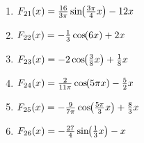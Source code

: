 \begin{Answer}[ref=trigStammfunktionA1]
\begin{minipage}{\textwidth}
{\begin{minipage}{0.5\linewidth}
\begin{enumerate}[label=\alph*)]
					\item \(F_{21}(x)=\frac{16}{3\pi}\sinn{\frac{3\pi}{4}x}-12x\)
					\item \(F_{22}(x)=-\frac{1}{3}\coss{6x}+2x\)
					\item \(F_{23}(x)=-2\coss{\frac{3}{8}x}+\frac{1}{8}x\)
					\item \(F_{24}(x)=\frac{2}{11\pi}\coss{5\pi x}-\frac{5}{2}x\)
					\item \(F_{25}(x)=-\frac{9}{7\pi}\coss{\frac{5\pi}{3}x}+\frac{8}{3}x\)
					\item \(F_{26}(x)=-\frac{27}{4}\sinn{\frac{1}{3}x}-x\)
				\end{enumerate}
		\end{minipage}}%
	\end{minipage}
\end{Answer}